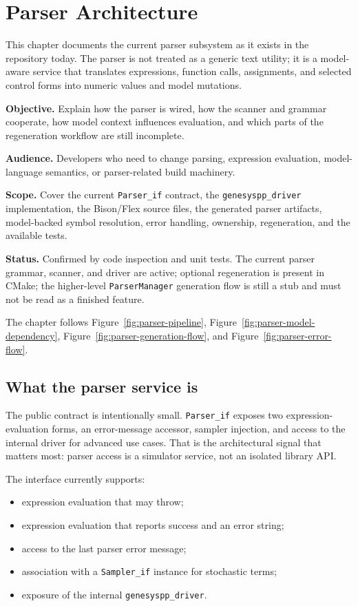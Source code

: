 \chapter{Parser Architecture}
\label{chap:parser-architecture}

This chapter documents the current parser subsystem as it exists in the
repository today. The parser is not treated as a generic text utility; it is a
model-aware service that translates expressions, function calls, assignments,
and selected control forms into numeric values and model mutations.

\noindent\textbf{Objective.} Explain how the parser is wired, how the scanner
and grammar cooperate, how model context influences evaluation, and which
parts of the regeneration workflow are still incomplete.

\noindent\textbf{Audience.} Developers who need to change parsing,
expression evaluation, model-language semantics, or parser-related build
machinery.

\noindent\textbf{Scope.} Cover the current \texttt{Parser\_if} contract, the
\texttt{genesyspp\_driver} implementation, the Bison/Flex source files, the
generated parser artifacts, model-backed symbol resolution, error handling,
ownership, regeneration, and the available tests.

\noindent\textbf{Status.} Confirmed by code inspection and unit tests. The
current parser grammar, scanner, and driver are active; optional regeneration
is present in CMake; the higher-level \texttt{ParserManager} generation flow is
still a stub and must not be read as a finished feature.

The chapter follows Figure~\ref{fig:parser-pipeline},
Figure~\ref{fig:parser-model-dependency},
Figure~\ref{fig:parser-generation-flow}, and
Figure~\ref{fig:parser-error-flow}.

\section{What the parser service is}
\label{sec:parser-service}

The public contract is intentionally small. \texttt{Parser\_if} exposes two
expression-evaluation forms, an error-message accessor, sampler injection, and
access to the internal driver for advanced use cases. That is the architectural
signal that matters most: parser access is a simulator service, not an isolated
library API.

The interface currently supports:
\begin{itemize}
\item expression evaluation that may throw;
\item expression evaluation that reports success and an error string;
\item access to the last parser error message;
\item association with a \texttt{Sampler\_if} instance for stochastic terms;
\item exposure of the internal \texttt{genesyspp\_driver}.
\end{itemize}

